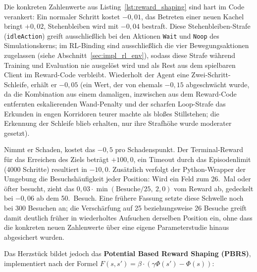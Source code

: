\documentclass[
  a4paper,
  11pt,
  twoside,
  BCOR=8mm,           %
  headings=big,
  numbers=noenddot,
  listof=totoc,       %
  captions=tableheading,
]{scrreprt}
\begin{document}
Die konkreten Zahlenwerte aus Listing~\ref{lst:reward_shaping} sind hart im Code verankert:
Ein normaler Schritt kostet $-0{,}01$, das Betreten einer neuen Kachel bringt $+0{,}02$, Stehenbleiben wird mit $-0{,}04$ bestraft. Diese Stehenbleiben-Strafe (\texttt{idleAction}) greift ausschließlich bei den Aktionen \texttt{Wait} und \texttt{Noop} des Simulationskerns; im RL-Binding sind ausschließlich die vier Bewegungsaktionen zugelassen (siehe Abschnitt~\ref{sec:impl_rl_env}), sodass diese Strafe während Training und Evaluation nie ausgelöst wird und als Rest aus dem spielbaren Client im Reward-Code verbleibt. Wiederholt der Agent eine Zwei-Schritt-Schleife, erhält er $-0{,}05$ (ein Wert, der von ehemals $-0{,}15$ abgeschwächt wurde, da die Kombination aus einem damaligen, inzwischen aus dem Reward-Code entfernten eskalierenden Wand-Penalty und der scharfen Loop-Strafe das Erkunden in engen Korridoren teurer machte als bloßes Stillstehen; die Erkennung der Schleife blieb erhalten, nur ihre Strafhöhe wurde moderater gesetzt).

Nimmt er Schaden, kostet das $-0{,}5$ pro Schadenspunkt. Der Terminal-Reward für das Erreichen des Ziels beträgt $+100{,}0$, ein Timeout durch das Episodenlimit (4000 Schritte) resultiert in $-10{,}0$. Zusätzlich verfolgt der Python-Wrapper der Umgebung die Besuchshäufigkeit jeder Position: Wird ein Feld zum 26.\ Mal oder öfter besucht, zieht das $0{,}03 \cdot \min(\text{Besuche}/25,\ 2{,}0)$ vom Reward ab, gedeckelt bei $-0{,}06$ ab dem 50.\ Besuch. Eine frühere Fassung setzte diese Schwelle noch bei 300 Besuchen an; die Verschärfung auf 25 beziehungsweise 26 Besuche greift damit deutlich früher in wiederholtes Aufsuchen derselben Position ein, ohne dass die konkreten neuen Zahlenwerte über eine eigene Parameterstudie hinaus abgesichert wurden.

Das Herzstück bildet jedoch das \textbf{Potential Based Reward Shaping (PBRS)}, implementiert nach der Formel $F(s,s') = \beta \cdot (\gamma\Phi(s') - \Phi(s))$:
\end{document}

